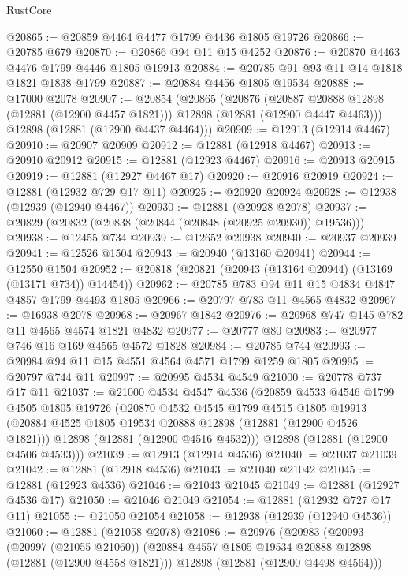 \begin{lexlean}{RustCore}
\begin{coremodule}
@20865 := @20859 @4464 @4477 @1799 @4436 @1805 @19726
@20866 := @20785 @679
@20870 := @20866 @94 @11 @15 @4252
@20876 := @20870 @4463 @4476 @1799 @4446 @1805 @19913
@20884 := @20785 @91 @93 @11 @14 @1818 @1821 @1838 @1799
@20887 := @20884 @4456 @1805 @19534
@20888 := @17000 @2078
@20907 := @20854
    (@20865
      (@20876
        (@20887 @20888 @12898 (@12881 (@12900 @4457 @1821)))
        @12898
        (@12881 (@12900 @4447 @4463)))
      @12898
      (@12881 (@12900 @4437 @4464)))
@20909 := @12913 (@12914 @4467)
@20910 := @20907 @20909
@20912 := @12881 (@12918 @4467)
@20913 := @20910 @20912
@20915 := @12881 (@12923 @4467)
@20916 := @20913 @20915
@20919 := @12881 (@12927 @4467 @17)
@20920 := @20916 @20919
@20924 := @12881 (@12932 @729 @17 @11)
@20925 := @20920 @20924
@20928 := @12938 (@12939 (@12940 @4467))
@20930 := @12881 (@20928 @2078)
@20937 := @20829 (@20832 (@20838 (@20844 (@20848 (@20925 @20930)) @19536)))
@20938 := @12455 @734
@20939 := @12652 @20938
@20940 := @20937 @20939
@20941 := @12526 @1504
@20943 := @20940 (@13160 @20941)
@20944 := @12550 @1504
@20952 := @20818 (@20821 (@20943 (@13164 @20944) (@13169 (@13171 @734)) @14454))
@20962 := @20785 @783 @94 @11 @15 @4834 @4847 @4857 @1799 @4493 @1805
@20966 := @20797 @783 @11 @4565 @4832
@20967 := @16938 @2078
@20968 := @20967 @1842
@20976 := @20968 @747 @145 @782 @11 @4565 @4574 @1821 @4832
@20977 := @20777 @80
@20983 := @20977 @746 @16 @169 @4565 @4572 @1828
@20984 := @20785 @744
@20993 := @20984 @94 @11 @15 @4551 @4564 @4571 @1799 @1259 @1805
@20995 := @20797 @744 @11
@20997 := @20995 @4534 @4549
@21000 := @20778 @737 @17 @11
@21037 := @21000
    @4534
    @4547
    @4536
    (@20859
      @4533
      @4546
      @1799
      @4505
      @1805
      @19726
      (@20870
        @4532
        @4545
        @1799
        @4515
        @1805
        @19913
        (@20884 @4525 @1805 @19534 @20888 @12898 (@12881 (@12900 @4526 @1821)))
        @12898
        (@12881 (@12900 @4516 @4532)))
      @12898
      (@12881 (@12900 @4506 @4533)))
@21039 := @12913 (@12914 @4536)
@21040 := @21037 @21039
@21042 := @12881 (@12918 @4536)
@21043 := @21040 @21042
@21045 := @12881 (@12923 @4536)
@21046 := @21043 @21045
@21049 := @12881 (@12927 @4536 @17)
@21050 := @21046 @21049
@21054 := @12881 (@12932 @727 @17 @11)
@21055 := @21050 @21054
@21058 := @12938 (@12939 (@12940 @4536))
@21060 := @12881 (@21058 @2078)
@21086 := @20976
    (@20983
      (@20993
        (@20997 (@21055 @21060))
        (@20884 @4557 @1805 @19534 @20888 @12898 (@12881 (@12900 @4558 @1821)))
        @12898
        (@12881 (@12900 @4498 @4564)))

\end{coremodule}
\end{lexlean}
